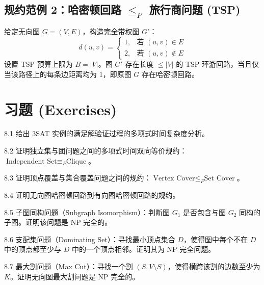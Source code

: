 \subsection*{规约范例 2：哈密顿回路 $\le_P$ 旅行商问题 (TSP)}
给定无向图 $G = (V, E)$，构造完全带权图 $G'$：
\[
d(u, v) = \begin{cases}
1, & \text{若 } (u, v) \in E \\
2, & \text{若 } (u, v) \notin E
\end{cases}
\]
设置 TSP 预算上限为 $B = |V|$。图 $G'$ 存在长度 $\le |V|$ 的 TSP 环游回路，当且仅当该路径上的每条边距离均为 1，即原图 $G$ 存在哈密顿回路。

\newpage
\section*{习题 (Exercises)}

\begin{exercise}{8.1}
给出 3SAT 实例的满足解验证过程的多项式时间复杂度分析。
\end{exercise}

\begin{exercise}{8.2}
证明独立集与团问题之间的多项式时间双向等价规约：$\text{Independent Set} \equiv_P \text{Clique}$。
\end{exercise}

\begin{exercise}{8.3}
证明顶点覆盖与集合覆盖问题之间的规约：$\text{Vertex Cover} \le_P \text{Set Cover}$。
\end{exercise}

\begin{exercise}{8.4}
证明无向图哈密顿回路到有向图哈密顿回路的规约。
\end{exercise}

\begin{exercise}{8.5}
子图同构问题（Subgraph Isomorphism）：判断图 $G_1$ 是否包含与图 $G_2$ 同构的子图。证明该问题是 NP 完全的。
\end{exercise}

\begin{exercise}{8.6}
支配集问题（Dominating Set）：寻找最小顶点集合 $D$，使得图中每个不在 $D$ 中的顶点都至少与 $D$ 中的一个顶点相邻。证明其为 NP 完全问题。
\end{exercise}

\begin{exercise}{8.7}
最大割问题（Max Cut）：寻找一个割 $(S, V \setminus S)$，使得横跨该割的边数至少为 $K$。证明无向图最大割问题是 NP 完全的。
\end{exercise}

